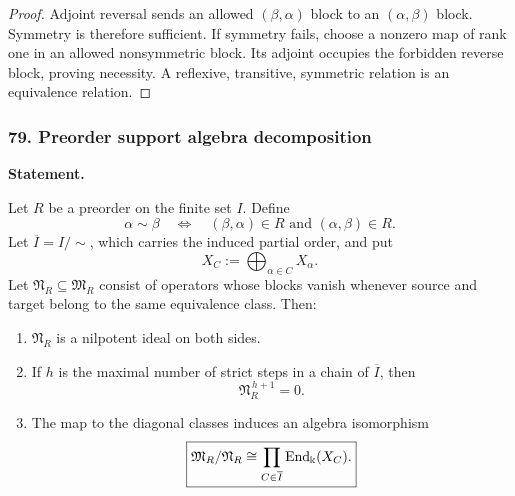 \begin{proof}
Adjoint reversal sends an allowed $(\beta,\alpha)$ block to an $(\alpha,\beta)$ block.  Symmetry is therefore sufficient.  If symmetry fails, choose a nonzero map of rank one in an allowed nonsymmetric block.  Its adjoint occupies the forbidden reverse block, proving necessity.  A reflexive, transitive, symmetric relation is an equivalence relation.
\end{proof}
\subsubsection*{79. Preorder support algebra decomposition}
\label{rec:PSC-I-T-PREORDER-ALGEBRA-DECOMPOSITION}
\textbf{Statement.}\par
Let $R$ be a preorder on the finite set $I$.  Define
\[
\alpha\sim\beta
\quad\Longleftrightarrow\quad
(\beta,\alpha)\in R\text{ and }(\alpha,\beta)\in R.
\]
Let $\overline I=I/{\sim}$, which carries the induced partial order, and put
\[
X_C:=\bigoplus_{\alpha\in C}X_\alpha.
\]
Let $\mathfrak N_R\subseteq\mathfrak M_R$ consist of operators whose blocks vanish whenever source and target belong to the same equivalence class.  Then:
\begin{enumerate}[label=(\roman*)]
\item $\mathfrak N_R$ is a nilpotent ideal on both sides.
\item If $h$ is the maximal number of strict steps in a chain of $\overline I$, then
\[
\mathfrak N_R^{\,h+1}=0.
\]
\item The map to the diagonal classes induces an algebra isomorphism
\[
\boxed{
\mathfrak M_R/\mathfrak N_R
\cong
\prod_{C\in\overline I}\operatorname{End}_{\Bbbk}(X_C).
}
\]
\end{enumerate}

